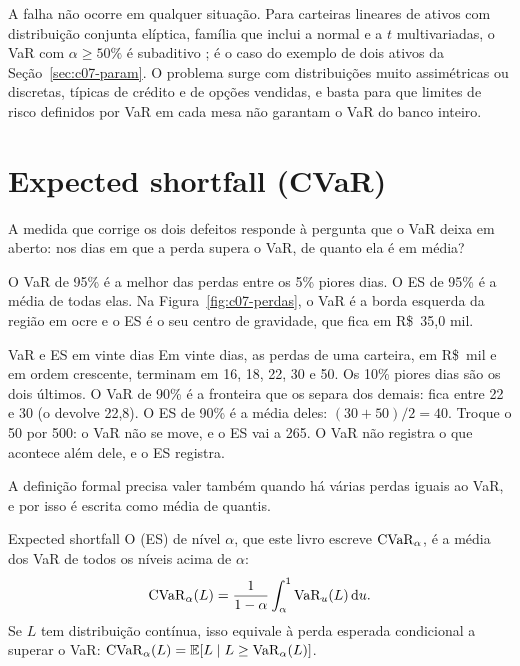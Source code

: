 A falha não ocorre em qualquer situação. Para carteiras lineares de ativos com distribuição conjunta elíptica, família que inclui a normal e a $t$ multivariadas, o VaR com $\alpha \ge 50\%$ é subaditivo \citep{mcneil2015}; é o caso do exemplo de dois ativos da Seção~\ref{sec:c07-param}. O problema surge com distribuições muito assimétricas ou discretas, típicas de crédito e de opções vendidas, e basta para que limites de risco definidos por VaR em cada mesa não garantam o VaR do banco inteiro.

\section{Expected shortfall (CVaR)}
\label{sec:c07-es}

A medida que corrige os dois defeitos responde à pergunta que o VaR deixa em aberto: nos dias em que a perda supera o VaR, de quanto ela é em média?

\begin{intuicao}
O VaR de 95\% é a melhor das perdas entre os 5\% piores dias. O ES de 95\% é a média de todas elas. Na Figura~\ref{fig:c07-perdas}, o VaR é a borda esquerda da região em ocre e o ES é o seu centro de gravidade, que fica em R\$~35,0 mil.
\end{intuicao}

\begin{exemplo}{VaR e ES em vinte dias}
Em vinte dias, as perdas de uma carteira, em R\$~mil e em ordem crescente, terminam em 16, 18, 22, 30 e 50. Os 10\% piores dias são os dois últimos. O VaR de 90\% é a fronteira que os separa dos demais: fica entre 22 e 30 (o  devolve 22,8). O ES de 90\% é a média deles: $(30 + 50)/2 = 40$. Troque o 50 por 500: o VaR não se move, e o ES vai a 265. O VaR não registra o que acontece além dele, e o ES registra.
\end{exemplo}

A definição formal precisa valer também quando há várias perdas iguais ao VaR, e por isso é escrita como média de quantis.

\begin{definicao}{Expected shortfall}
O  (ES) de nível $\alpha$, que este livro escreve $\operatorname{CVaR}_\alpha$, é a média dos VaR de todos os níveis acima de $\alpha$:
\begin{equation}
  \operatorname{CVaR}_\alpha(L) = \frac{1}{1-\alpha}\int_\alpha^1 \operatorname{VaR}_u(L)\mathop{}\!\mathrm{d} u .
  \label{eq:c07-es}
\end{equation}
Se $L$ tem distribuição contínua, isso equivale à perda esperada condicional a superar o VaR: $\operatorname{CVaR}_\alpha(L) = \operatorname{\mathbb{E}}[L \mid L \ge \operatorname{VaR}_\alpha(L)]$.
\end{definicao}

